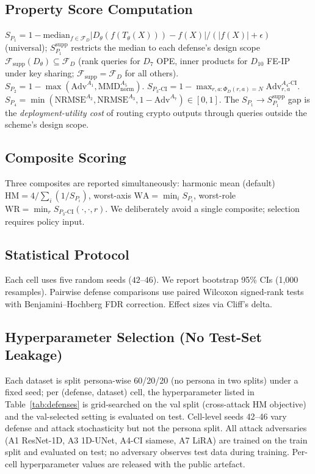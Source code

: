 \documentclass{article}
\theoremstyle{remark}
\newcommand{\Adv}{\mathrm{Adv}}
\newcommand{\NRMSE}{\mathrm{NRMSE}}
\newcommand{\MMD}{\mathrm{MMD}}
\newcommand{\SCI}{S_{P_3\text{-CI}}}
\begin{document}
\subsection{Property Score Computation}
$S_{P_1} = 1 - \mathrm{median}_{f \in \mathcal{F}_D} |D_\theta(f(T_\theta(X))) - f(X)| / (|f(X)| + \epsilon)$ (universal); $S_{P_1}^{\text{supp}}$ restricts the median to each defense's design scope $\mathcal{F}_{\text{supp}}(D_\theta) \subseteq \mathcal{F}_D$ (rank queries for $D_7$ OPE, inner products for $D_{10}$ FE-IP under key sharing; $\mathcal{F}_{\text{supp}} = \mathcal{F}_D$ for all others). $S_{P_2} = 1 - \max(\Adv^{A_1}, \MMD^{A_5}_{\text{norm}})$. $\SCI = 1 - \max_{r,a:\Phi_D(r,a)=N} \Adv^{A_4\text{-CI}}_{r,a}$. $S_{P_4} = \min(\NRMSE^{A_2}, \NRMSE^{A_3}, 1 - \Adv^{A_7}) \in [0,1]$. The $S_{P_1} \to S_{P_1}^{\text{supp}}$ gap is the \emph{deployment-utility cost} of routing crypto outputs through queries outside the scheme's design scope.

\subsection{Composite Scoring}
Three composites are reported simultaneously: harmonic mean (default) $\text{HM} = 4 / \sum_i (1/S_{P_i})$, worst-axis $\text{WA} = \min_i S_{P_i}$, worst-role $\text{WR} = \min_r \SCI(\cdot, \cdot, r)$. We deliberately avoid a single composite; selection requires policy input.

\subsection{Statistical Protocol}
Each cell uses five random seeds ($42$--$46$). We report bootstrap 95\% CIs (1{,}000 resamples). Pairwise defense comparisons use paired Wilcoxon signed-rank tests with Benjamini--Hochberg FDR correction. Effect sizes via Cliff's delta.

\subsection{Hyperparameter Selection (No Test-Set Leakage)}
\label{sec:hp_selection}
Each dataset is split persona-wise 60/20/20 (no persona in two splits) under a fixed seed; per (defense, dataset) cell, the hyperparameter listed in Table~\ref{tab:defenses} is grid-searched on the val split (cross-attack HM objective) and the val-selected setting is evaluated on test. Cell-level seeds 42--46 vary defense and attack stochasticity but not the persona split. All attack adversaries (A1 ResNet-1D, A3 1D-UNet, A4-CI siamese, A7 LiRA) are trained on the train split and evaluated on test; no adversary observes test data during training. Per-cell hyperparameter values are released with the public artefact.
\end{document}
